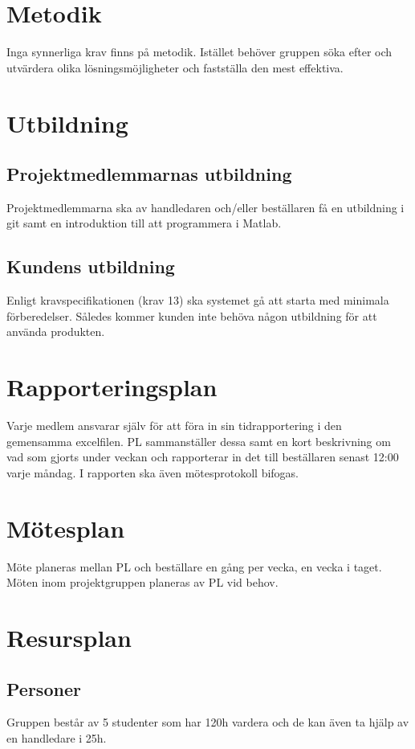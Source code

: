 \documentclass[10pt,swedish,oneside]{lips-no_customer}
\begin{document}
	\section{Metodik}
		Inga synnerliga krav finns på metodik. Istället behöver gruppen söka efter och utvärdera olika lösningsmöjligheter och fastställa den mest effektiva.
	
	\section{Utbildning}
		\subsection{Projektmedlemmarnas utbildning}
		Projektmedlemmarna ska av handledaren och/eller beställaren få en utbildning i git samt en introduktion till att programmera i Matlab.
		\subsection{Kundens utbildning}
		Enligt kravspecifikationen (krav 13) ska systemet gå att starta med minimala förberedelser. Således kommer kunden inte behöva någon utbildning för att använda produkten.
	
	\section{Rapporteringsplan}
		Varje medlem ansvarar själv för att föra in sin tidrapportering i den gemensamma excelfilen. PL sammanställer dessa samt en kort beskrivning om vad som gjorts under veckan och rapporterar in det till beställaren senast 12:00 varje måndag. I rapporten ska även mötesprotokoll bifogas.
	
	\section{Mötesplan}
		Möte planeras mellan PL och beställare en gång per vecka, en vecka i taget. Möten inom projektgruppen planeras av PL vid behov.
	
	\section{Resursplan}
		\subsection{Personer}
		Gruppen består av 5 studenter som har 120h vardera och de kan även ta hjälp av en handledare i 25h.
\end{document}

